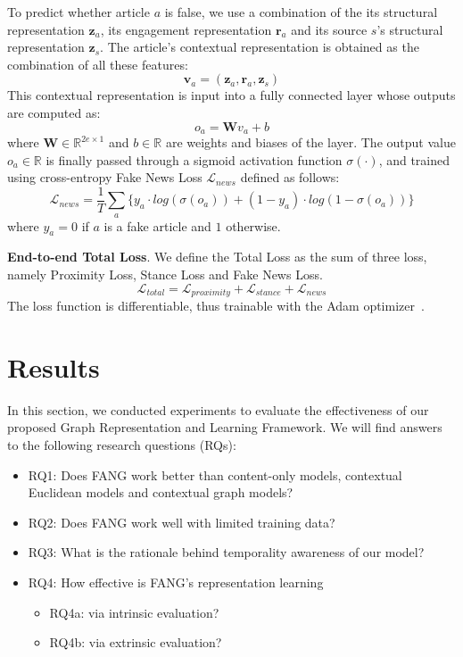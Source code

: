 \documentclass[fyp]{socreport}
\theoremstyle{definition}
\theoremstyle{hypothesis}
\begin{document}
To predict whether article $a$ is false, we use a combination of the its structural representation $\boldsymbol{z}_a$, its engagement representation $\boldsymbol{r}_a$ and its source $s$'s structural representation $\boldsymbol{z}_s$. The article's contextual representation is obtained as the combination of all these features:
\begin{equation}
    \boldsymbol{v}_a = (\boldsymbol{z}_a, \boldsymbol{r}_a, \boldsymbol{z}_s)
\end{equation}
This contextual representation is input into a fully connected layer whose outputs are computed as:
\begin{equation}
    o_a = \mathbf{W}v_a+b
\end{equation}
where $\boldsymbol{W}\in \mathbb{R}^{2e\times 1}$ and $b\in \mathbb{R}$ are weights and biases of the layer. The output value $o_a \in \mathbb{R}$
is finally passed through a sigmoid activation function $\sigma(\cdot)$, and trained using cross-entropy Fake News Loss $\mathcal{L}_{news}$ defined as follows:   
\begin{equation}
    \mathcal{L}_{news}=\frac{1}{T}\sum_a\{{y}_{a} \cdot log(\sigma({o}_{a}))+(1-{y}_{a})\cdot log(1-\sigma({o}_{a}))\}
\end{equation}
where $y_{a}=0$ if $a$ is a fake article and $1$ otherwise.

\textbf{End-to-end Total Loss}. We define the Total Loss as the sum of three loss, namely Proximity Loss, Stance Loss and Fake News Loss.
\begin{equation}
    \mathcal{L}_{total} = \mathcal{L}_{proximity} + \mathcal{L}_{stance} + \mathcal{L}_{news}
\end{equation}
The loss function is differentiable, thus trainable with the Adam optimizer~\cite{kingma2015adam}. 

\chapter{Results}
In this section, we conducted experiments to evaluate the effectiveness of our proposed Graph Representation and Learning Framework. We will find answers to the following research questions (RQs):
\begin{itemize}
    \item RQ1: Does FANG work better than content-only models, contextual Euclidean models and contextual graph models?
    \item RQ2: Does FANG work well with limited training data?
    \item RQ3: What is the rationale behind temporality awareness of our model?
    \item RQ4: How effective is FANG's representation learning
    \begin{itemize}
        \item RQ4a: via intrinsic evaluation?
        \item RQ4b: via extrinsic evaluation?
    \end{itemize}
\end{itemize}
\end{document}
